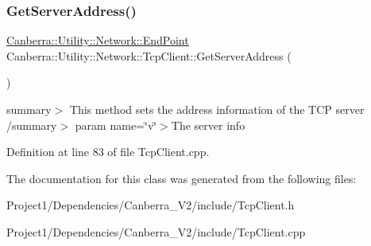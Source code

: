 \subsubsection{\texorpdfstring{Get\+Server\+Address()}{GetServerAddress()}}
{\footnotesize\ttfamily \hyperlink{class_canberra_1_1_utility_1_1_network_1_1_end_point}{Canberra\+::\+Utility\+::\+Network\+::\+End\+Point} Canberra\+::\+Utility\+::\+Network\+::\+Tcp\+Client\+::\+Get\+Server\+Address (\begin{DoxyParamCaption}{ }\end{DoxyParamCaption})}

summary$>$ This method sets the address information of the T\+CP server /summary$>$ param name=\char`\"{}v\char`\"{}$>$The server info

Definition at line 83 of file Tcp\+Client.\+cpp.



The documentation for this class was generated from the following files\+:\begin{DoxyCompactItemize}
\item 
Project1/\+Dependencies/\+Canberra\+\_\+\+V2/include/Tcp\+Client.\+h\item 
Project1/\+Dependencies/\+Canberra\+\_\+\+V2/include/Tcp\+Client.\+cpp\end{DoxyCompactItemize}
